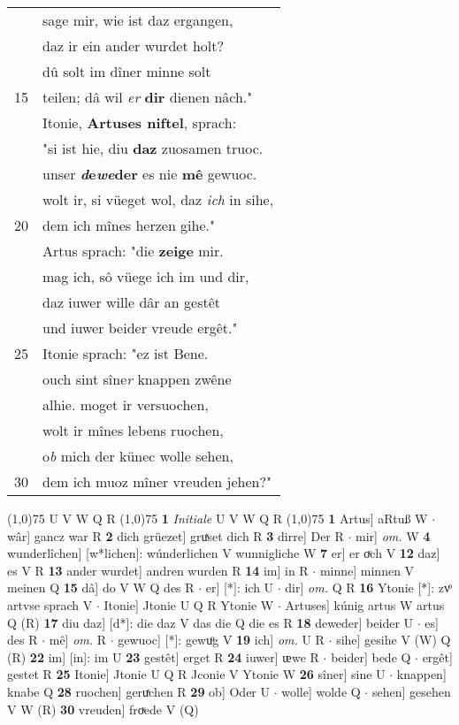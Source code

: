 \documentclass[8pt,a4paper,notitlepage]{article}
\begin{document}
\begin{table}[ht]
\begin{minipage}[t]{0.5\linewidth}
\begin{tabular}{rl}
 & sage mir, wie ist daz ergangen,\\ 
 & daz ir ein ander wurdet holt?\\ 
 & dû solt im dîner minne solt\\ 
15 & teilen; dâ wil \textit{er} \textbf{dir} dienen nâch."\\ 
 & Itonie, \textbf{Artuses niftel}, sprach:\\ 
 & "si ist hie, diu \textbf{daz} zuosamen truoc.\\ 
 & unser \textbf{\textit{d}e\textit{we}der} es nie \textbf{mê} gewuoc.\\ 
 & wolt ir, si vüeget wol, daz \textit{ich} in sihe,\\ 
20 & dem ich mînes herzen gihe."\\ 
 & Artus sprach: "die \textbf{zeige} mir.\\ 
 & mag ich, sô vüege ich im und dir,\\ 
 & daz iuwer wille dâr an gestêt\\ 
 & und iuwer beider vreude ergêt."\\ 
25 & Itonie sprach: "ez ist Bene.\\ 
 & ouch sint sîne\textit{r} knappen zwêne\\ 
 & alhie. moget ir versuochen,\\ 
 & wolt ir mînes lebens ruochen,\\ 
 & o\textit{b} mich der künec wolle sehen,\\ 
30 & dem ich muoz mîner vreuden jehen?"\\ 
\end{tabular}
\scriptsize
\line(1,0){75} \newline
U V W Q R \newline
\line(1,0){75} \newline
\textbf{1} \textit{Initiale} U V W Q R  \newline
\line(1,0){75} \newline
\textbf{1} Artus] aRtuß W  $\cdot$ wâr] gancz war R \textbf{2} dich grüezet] gruͯset dich R \textbf{3} dirre] Der R  $\cdot$ mir] \textit{om.} W \textbf{4} wunderlîchen] [w*lichen]: wúnderlichen V wunnigliche W \textbf{7} er] er oͮch V \textbf{12} daz] es V R \textbf{13} ander wurdet] andren wurden R \textbf{14} im] in R  $\cdot$ minne] minnen V meinen Q \textbf{15} dâ] do V W Q des R  $\cdot$ er] [*]: ich U  $\cdot$ dir] \textit{om.} Q R \textbf{16} Ytonie [*]: zvͦ artvse sprach V  $\cdot$ Itonie] Jtonie U Q R Ytonie W  $\cdot$ Artuses] kúnig artus W artus Q (R) \textbf{17} diu daz] [d*]: die daz V das die Q die es R \textbf{18} deweder] beider U  $\cdot$ es] des R  $\cdot$ mê] \textit{om.} R  $\cdot$ gewuoc] [*]: gewuͦg V \textbf{19} ich] \textit{om.} U R  $\cdot$ sihe] gesihe V (W) Q (R) \textbf{22} im] [in]: im U \textbf{23} gestêt] erget R \textbf{24} iuwer] ᵫwe R  $\cdot$ beider] bede Q  $\cdot$ ergêt] gestet R \textbf{25} Itonie] Jtonie U Q R Jconie V Ytonie W \textbf{26} sîner] sine U  $\cdot$ knappen] knabe Q \textbf{28} ruochen] geruͯchen R \textbf{29} ob] Oder U  $\cdot$ wolle] wolde Q  $\cdot$ sehen] gesehen V W (R) \textbf{30} vreuden] froͮede V (Q) \newline

\end{minipage}
\end{table}
\end{document}

